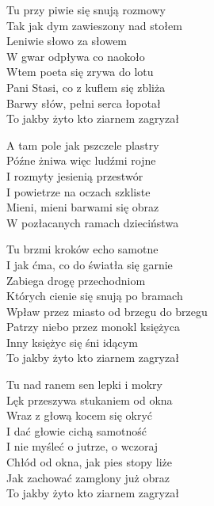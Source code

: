 \begin{textn}
    \chordfill
    Tu przy piwie się snują rozmowy\\
    Tak jak dym zawieszony nad stołem\\
    Leniwie słowo za słowem\\
    W gwar odpływa co naokoło\\
    Wtem poeta się zrywa do lotu\\
    Pani Stasi, co z kuflem się zbliża\\
    Barwy słów, pełni serca łopotał\\
    To jakby żyto kto ziarnem zagryzał

    \vin A tam pole jak pszczele plastry\\
    \vin Późne żniwa więc ludźmi rojne\\
    \vin I rozmyty jesienią przestwór\\
    \vin I powietrze na oczach szkliste\\
    \vin Mieni, mieni barwami się obraz\\
    \vin W pozłacanych ramach dzieciństwa

    Tu brzmi kroków echo samotne\\
    I jak ćma, co do światła się garnie\\
    Zabiega drogę przechodniom\\
    Których cienie się snują po bramach\\
    Wpław przez miasto od brzegu do brzegu\\
    Patrzy niebo przez monokl księżyca\\
    Inny księżyc się śni idącym\\
    To jakby żyto kto ziarnem zagryzał

    Tu nad ranem sen lepki i mokry\\
    Lęk przeszywa stukaniem od okna\\
    Wraz z głową kocem się okryć\\
    I dać głowie cichą samotność\\
    I nie myśleć o jutrze, o wczoraj\\
    Chłód od okna, jak pies stopy liże\\
    Jak zachować zamglony już obraz\\
    To jakby żyto kto ziarnem zagryzał
\end{textn}
